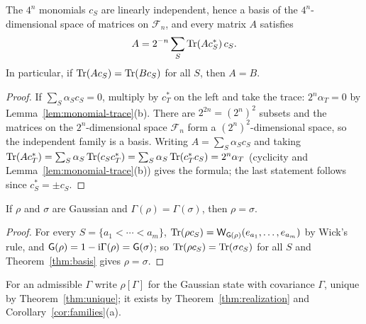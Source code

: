 \begin{theorem}\label{thm:basis}
The $4^n$ monomials $c_S$ are linearly independent, hence a basis of the $4^n$-dimensional
space of matrices on $\mathcal F_n$, and every matrix $A$ satisfies
\[
 A=2^{-n}\sum_S\operatorname{Tr}(Ac_S^*)\,c_S .
\]
In particular, if $\operatorname{Tr}(Ac_S)=\operatorname{Tr}(Bc_S)$ for all $S$, then $A=B$.
\end{theorem}
\begin{proof}
If $\sum_S\alpha_Sc_S=0$, multiply by $c_T^*$ on the left and take the trace:
$2^n\alpha_T=0$ by Lemma~\ref{lem:monomial-trace}(b). There are $2^{2n}=(2^n)^2$ subsets and
the matrices on the $2^n$-dimensional space $\mathcal F_n$ form a $(2^n)^2$-dimensional space, so the
independent family is a basis. Writing $A=\sum_S\alpha_Sc_S$ and taking
$\operatorname{Tr}(Ac_T^*)=\sum_S\alpha_S\operatorname{Tr}(c_Sc_T^*)=\sum_S\alpha_S\operatorname{Tr}(c_T^*c_S)=2^n\alpha_T$ (cyclicity and
Lemma~\ref{lem:monomial-trace}(b)) gives the formula; the last statement follows since
$c_S^*=\pm c_S$.
\end{proof}

\begin{theorem}\label{thm:unique}
If $\rho$ and $\sigma$ are Gaussian and $\Gamma(\rho)=\Gamma(\sigma)$, then $\rho=\sigma$.
\end{theorem}
\begin{proof}
For every $S=\{a_1<\cdots<a_m\}$, $\operatorname{Tr}(\rho c_S)=\mathsf W_{\mathsf G(\rho)}(e_{a_1},\ldots,e_{a_m})$ by
Wick's rule, and $\mathsf G(\rho)=1-\mathrm i\Gamma(\rho)=\mathsf G(\sigma)$; so $\operatorname{Tr}(\rho c_S)=\operatorname{Tr}(\sigma c_S)$ for
all $S$ and Theorem~\ref{thm:basis} gives $\rho=\sigma$.
\end{proof}
For an admissible $\Gamma$ write $\rho[\Gamma]$ for the Gaussian state with covariance
$\Gamma$, unique by Theorem~\ref{thm:unique}; it exists by Theorem~\ref{thm:realization} and
Corollary~\ref{cor:families}(a).

